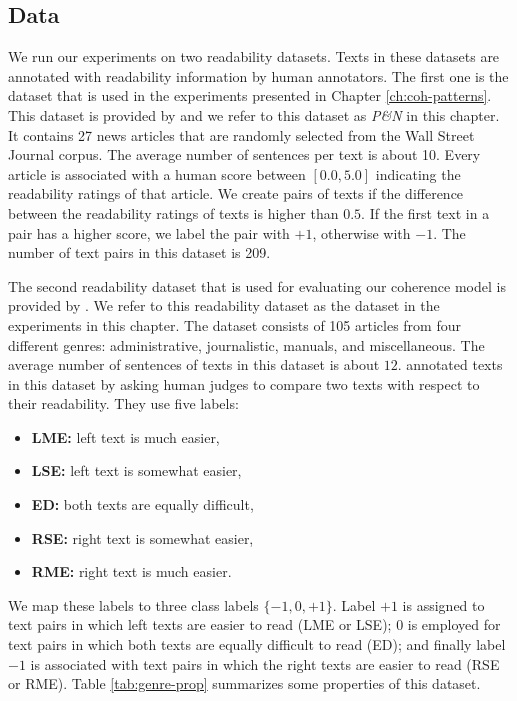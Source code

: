\subsection{Data}
We run our experiments on two readability datasets. 
Texts in these datasets are annotated with readability information by human annotators.
The first one is the dataset that is used in the experiments presented in Chapter \ref{ch:coh-patterns}. 
This dataset is provided by  and we refer to this dataset as \emph{P\&N} in this chapter.  
It contains 27 news articles that are randomly selected from
the Wall Street Journal corpus. 
The average number of sentences per text is about 10.   
Every article is associated with a human score between $[0.0,5.0]$ indicating the readability ratings of that article. 
We create pairs of texts if the difference between the readability ratings of texts is higher than $0.5$. 
If the first text in a pair has a higher score, we label
the pair with $+1$, otherwise with $-1$. 
The number of text pairs in this dataset is 209.

The second readability dataset that is used for evaluating our coherence model is provided by .  
We refer to this readability dataset as the \declercqds dataset in the experiments in this chapter.  
The \declercqds dataset consists of 105 articles from four different genres: administrative, journalistic, manuals, and miscellaneous. 
The average number of sentences of texts in this dataset is about $12$. 
 annotated texts in this dataset by asking human judges to compare two texts with respect to their readability. 
They use five labels:

\begin{itemize}
  \item \textbf{LME:} left text is much easier,
  \item \textbf{LSE:} left text is somewhat easier, 
  \item \textbf{ED:} both texts are equally difficult,
  \item \textbf{RSE:} right text is somewhat easier,
  \item \textbf{RME:} right text is much easier.
\end{itemize}

We map these labels to three class labels $\lbrace -1, 0, +1 \rbrace$.  Label $+1$ is assigned to text pairs in which left texts are easier to read (LME or LSE); 
$0$ is employed for text pairs in which both texts are equally difficult to read (ED); and finally label $-1$ is associated with text pairs in which the right texts are easier to read (RSE or RME). 
Table \ref{tab:genre-prop} summarizes some properties of this dataset.


